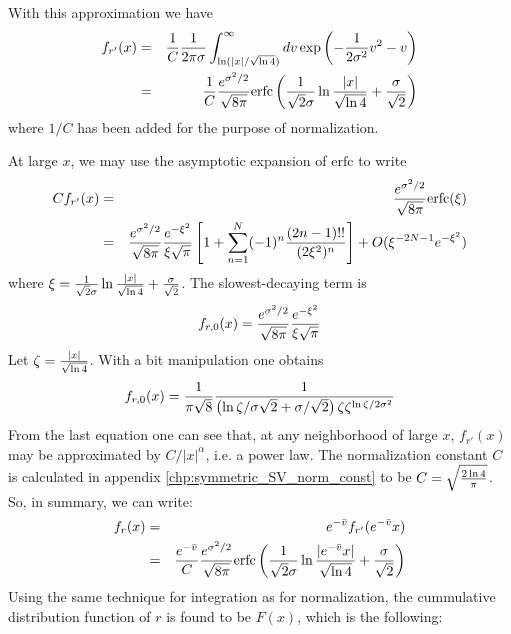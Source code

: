 With this approximation we have
\begin{eqnarray*}
  f_{r'}(x) &=& {1\over C}{1 \over 2\pi\sigma} \int_{\ln(|x|/\sqrt{\ln
      4})}^{\infty} dv
  \exp\left(-{1 \over 2\sigma^2} v^2 - v\right) \\
  &=& {1\over C}{e^{\sigma^2 / 2} \over \sqrt{8\pi}} \text{erfc} \left(
    {1 \over \sqrt{2}\sigma} \ln{|x| \over \sqrt{\ln 4}} + {\sigma
      \over \sqrt{2}}
  \right)
\end{eqnarray*}
where $1/C$ has been added for the purpose of normalization.

At large $x$, we may use the asymptotic expansion of $\mathrm{erfc}$
to write
\begin{eqnarray*}
  Cf_{r'}(x) &=& {e^{\sigma^2 / 2} \over \sqrt{8\pi}} \mathrm{erfc}(\xi) \\
  &=& {e^{\sigma^2 / 2} \over \sqrt{8 \pi}}
  \frac{e^{-\xi^2}}{\xi\sqrt{\pi}}\left[
    1 +
    \sum_{n=1}^N (-1)^n \frac{(2n-1)!!}{(2\xi^2)^n} \right] +
  O(\xi^{-2N-1} e^{-\xi^2})
\end{eqnarray*}
where $\xi = {1 \over \sqrt{2}\sigma} \ln{|x| \over \sqrt{\ln 4}} +
{\sigma \over \sqrt{2}}$. The slowest-decaying term is
\[
f_{r,0}(x) = {e^{\sigma^2 / 2} \over \sqrt{8\pi}}
\frac{e^{-\xi^2}}{\xi\sqrt{\pi}}
\]
Let $\zeta = {|x| \over \sqrt{\ln 4}}$. With a bit manipulation one
obtains
\begin{equation*}
  f_{r,0}(x) = {1 \over \pi \sqrt{8}}{1 \over
    \left(\ln\zeta/\sigma\sqrt{2} +
      \sigma/\sqrt{2}\right)\zeta\zeta^{\ln \zeta / 2\sigma^2}
  }
\end{equation*}
From the last equation one can see that, at any neighborhood of large
$x$, $f_{r'}(x)$ may be approximated by $C/|x|^\alpha$, i.e. a power law.
The normalization constant $C$ is calculated in appendix
\ref{chp:symmetric_SV_norm_const} to be $C = \sqrt{2 \ln 4\over
  \pi}$. So, in summary, we can write:
\begin{eqnarray*}
  f_r(x) &=& e^{-\bar{v}} f_{r'}(e^{-\bar{v}} x) \\
    &=& {e^{-\bar{v}} \over C}{e^{\sigma^2 / 2} \over \sqrt{8\pi}}
    \text{erfc} \left({1 \over \sqrt{2}\sigma} \ln{|e^{-\bar{v}}x| \over \sqrt{\ln
          4}} + {\sigma \over \sqrt{2}}
    \right) \\
\end{eqnarray*}
Using the same technique for integration as for normalization, the
cummulative distribution function of $r$ is found to be $F(x)$,
which is the following:
